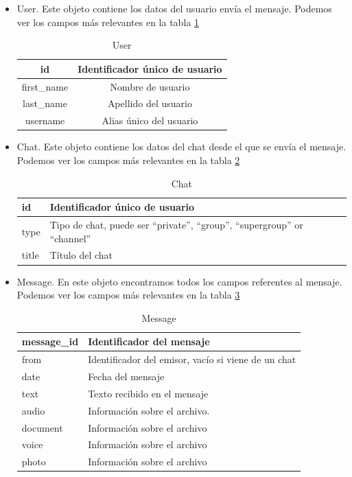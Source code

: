\documentclass[10pt,journal,compsoc]{IEEEtran}
\begin{document}
\begin{itemize}
  \item User. Este objeto contiene los datos del usuario envía el mensaje.
 Podemos ver los campos más relevantes en la tabla \ref{tab:User}
  
  \begin{table}[h]
  \centering
  \begin{tabular}{cc}
  id  & Identificador único de usuario \\ \hline
  first\_name & Nombre de usuario \\ \hline
  last\_name & Apellido del usuario \\ \hline
  username & Alias único del usuario \\ \hline
  \end{tabular} 
  \caption{User}
  \label{tab:User}
  \end{table}

  \item Chat. Este objeto contiene los datos del chat desde el que se envía el 
  mensaje. Podemos ver los campos más relevantes en la tabla \ref{tab:Chat}
  
   \begin{table}[h]
  \centering
  \begin{tabular}{>{\centering\arraybackslash}m{1cm} >{\centering\arraybackslash}m{4cm}}
  id  & Identificador único de usuario \\ \hline
  type & Tipo de chat, puede ser “private”, “group”, “supergroup” or “channel” 
  \\ \hline
  title & Título del chat \\ \hline
  \end{tabular} 
  \caption{Chat}
  \label{tab:Chat}
  \end{table}
  
  \item Message. En este objeto encontramos todos los campos referentes al 
  mensaje. Podemos ver los campos más relevantes en la tabla \ref{tab:Message}
  
   \begin{table}[h]
  \centering
  \begin{tabular}{>{\centering\arraybackslash}m{1cm} >{\centering\arraybackslash}m{4cm}}
  message\_id  & Identificador del mensaje \\ \hline
  from & Identificador del emisor, vacío si viene de un chat \\ \hline
  date & Fecha del mensaje \\ \hline
  text & Texto recibido en el mensaje \\ \hline
  audio & Información sobre el archivo. \\ \hline
  document & Información sobre el archivo \\ \hline
  voice & Información sobre el archivo \\ \hline
  photo & Información sobre el archivo \\ \hline
  \end{tabular} 
  \caption{Message}
  \label{tab:Message}
  \end{table}

\end{itemize}
\end{document}
